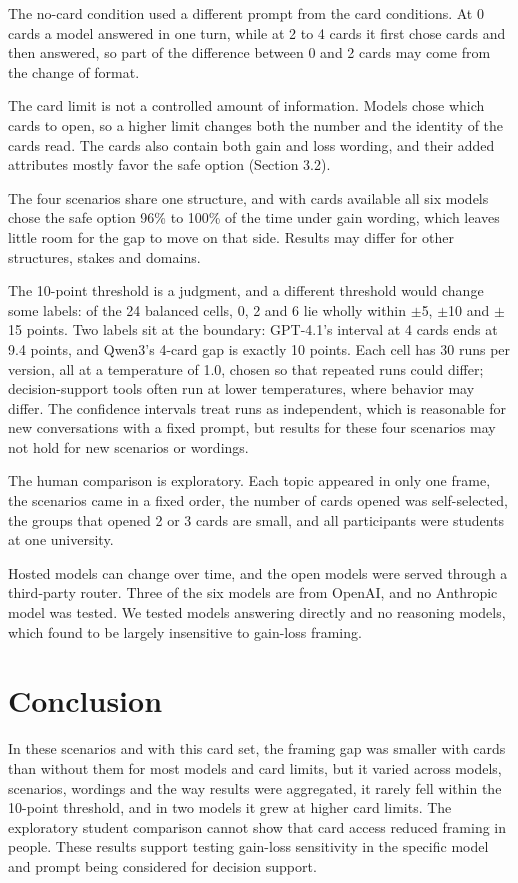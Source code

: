 \documentclass[11pt]{article}
\begin{document}
The no-card condition used a different prompt from the card conditions. At 0 cards a model answered in one turn, while at 2 to 4 cards it first chose cards and then answered, so part of the difference between 0 and 2 cards may come from the change of format.

The card limit is not a controlled amount of information. Models chose which cards to open, so a higher limit changes both the number and the identity of the cards read. The cards also contain both gain and loss wording, and their added attributes mostly favor the safe option (Section 3.2).

The four scenarios share one structure, and with cards available all six models chose the safe option 96\% to 100\% of the time under gain wording, which leaves little room for the gap to move on that side. Results may differ for other structures, stakes and domains.

The 10-point threshold is a judgment, and a different threshold would change some labels: of the 24 balanced cells, 0, 2 and 6 lie wholly within $\pm$5, $\pm$10 and $\pm$15 points. Two labels sit at the boundary: GPT-4.1's interval at 4 cards ends at 9.4 points, and Qwen3's 4-card gap is exactly 10 points. Each cell has 30 runs per version, all at a temperature of 1.0, chosen so that repeated runs could differ; decision-support tools often run at lower temperatures, where behavior may differ. The confidence intervals treat runs as independent, which is reasonable for new conversations with a fixed prompt, but results for these four scenarios may not hold for new scenarios or wordings.

The human comparison is exploratory. Each topic appeared in only one frame, the scenarios came in a fixed order, the number of cards opened was self-selected, the groups that opened 2 or 3 cards are small, and all participants were students at one university.

Hosted models can change over time, and the open models were served through a third-party router. Three of the six models are from OpenAI, and no Anthropic model was tested. We tested models answering directly and no reasoning models, which \citet{ge2026mind} found to be largely insensitive to gain-loss framing.

\section{Conclusion}

In these scenarios and with this card set, the framing gap was smaller with cards than without them for most models and card limits, but it varied across models, scenarios, wordings and the way results were aggregated, it rarely fell within the 10-point threshold, and in two models it grew at higher card limits. The exploratory student comparison cannot show that card access reduced framing in people. These results support testing gain-loss sensitivity in the specific model and prompt being considered for decision support.
\end{document}
